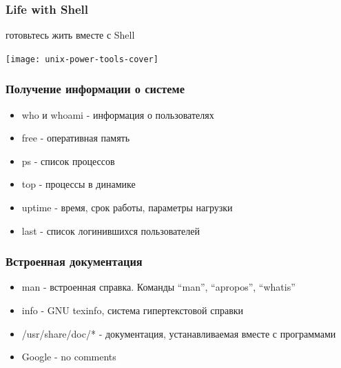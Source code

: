 \begin{frame}
  \frametitle{Life with Shell}

  \begin{center}
    \Large{готовьтесь жить вместе с Shell}
    \newline
    
    \texttt{[image: unix-power-tools-cover]} 
  \end{center}

\end{frame}

\begin{frame}
  \frametitle{Получение информации о системе}
  \begin{itemize}
    \item \Large{who} и \Large{whoami} - информация о пользователях \pause
    \item \Large{free} - оперативная память \pause
    \item \Large{ps} - список процессов \pause
    \item \Large{top} - процессы в динамике \pause
    \item \Large{uptime} - время, срок работы, параметры нагрузки \pause
    \item \Large{last} - список логинившихся пользователей 
  \end{itemize}
\end{frame}

\begin{frame}
  \frametitle{Встроенная документация}
  \begin{itemize}
    \item \Large{man} - встроенная справка. Команды ``man'', ``apropos'', ``whatis'' \pause
    \item info - GNU texinfo, система гипертекстовой справки \pause
    \item /usr/share/doc/* - документация, устанавливаемая вместе с программами \pause
    \item Google - no comments \pause
  \end{itemize}

\end{frame}


